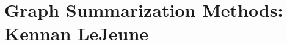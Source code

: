 \documentclass[../writeup.tex]{subfiles}
\begin{document}
\chapter{Graph Summarization Methods: Kennan LeJeune}\label{chapter:kennan}



\end{document}
